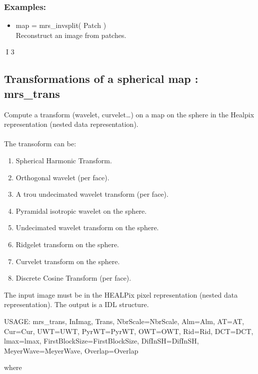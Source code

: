 \subsubsection*{Examples:} 
\begin{itemize}
\item map = mrs\_invsplit( Patch ) \\
Reconstruct an image from patches.
\end{itemize}



I 3

\subsection{Transformations of a spherical map : mrs\_trans}
Compute a transform (wavelet, curvelet\ldots) on a map on the sphere in the Healpix representation (nested data representation).\\ \\
The transoform can be:
\begin{enumerate}
\item Spherical Harmonic Transform.
\item Orthogonal wavelet (per face).
\item A trou undecimated wavelet transform (per face).
\item Pyramidal isotropic wavelet on the sphere.
\item Undecimated wavelet transform on the sphere.
\item Ridgelet transform on the sphere.
\item Curvelet transform on the sphere.
\item Discrete Cosine Transform (per face).
\end{enumerate}
The input image must be in the HEALPix pixel representation (nested data representation). The output is a IDL structure.
{\bf
\begin{center}
     USAGE: mrs\_trans, InImag, Trans, NbrScale=NbrScale, Alm=Alm, AT=AT, Cur=Cur, UWT=UWT, PyrWT=PyrWT, OWT=OWT, Rid=Rid, DCT=DCT, 
     					lmax=lmax, FirstBlockSize=FirstBlockSize, DifInSH=DifInSH, MeyerWave=MeyerWave, Overlap=Overlap
\end{center}}
where
